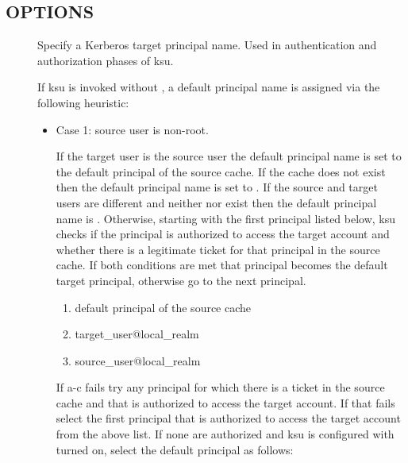 \documentclass[letterpaper,10pt,english]{sphinxmanual}
\begin{document}
\subsection{OPTIONS}
\label{\detokenize{user/user_commands/ksu:options}}\begin{description}
\item[{ }] \leavevmode
Specify a Kerberos target principal name.  Used in authentication
and authorization phases of ksu.

If ksu is invoked without , a default principal name is
assigned via the following heuristic:
\begin{itemize}
\item {} 
Case 1: source user is non-root.

If the target user is the source user the default principal name
is set to the default principal of the source cache.  If the
cache does not exist then the default principal name is set to
.  If the source and target users are
different and neither  nor
 exist then the default principal name
is .  Otherwise, starting
with the first principal listed below, ksu checks if the
principal is authorized to access the target account and whether
there is a legitimate ticket for that principal in the source
cache.  If both conditions are met that principal becomes the
default target principal, otherwise go to the next principal.
\begin{enumerate}
\item {} 
default principal of the source cache

\item {} 
target\_user@local\_realm

\item {} 
source\_user@local\_realm

\end{enumerate}

If a-c fails try any principal for which there is a ticket in
the source cache and that is authorized to access the target
account.  If that fails select the first principal that is
authorized to access the target account from the above list.  If
none are authorized and ksu is configured with
 turned on, select the default principal as
follows:


\end{itemize}
\end{description}
\end{document}
